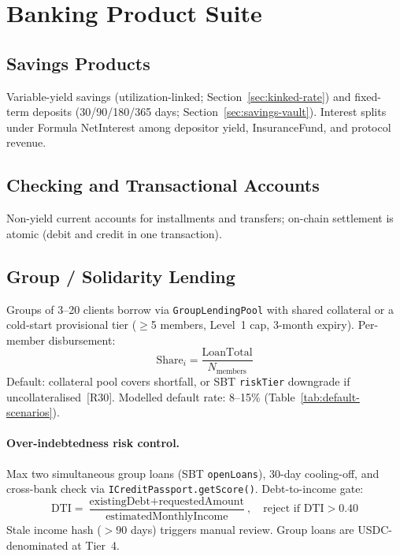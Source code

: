 \documentclass[12pt,a4paper]{report}
\begin{document}
\section{Banking Product Suite}
\label{sec:banking-products}

\subsection{Savings Products}
Variable-yield savings (utilization-linked; Section~\ref{sec:kinked-rate}) and fixed-term deposits (30/90/180/365 days; Section~\ref{sec:savings-vault}). Interest splits under Formula NetInterest among depositor yield, InsuranceFund, and protocol revenue.

\subsection{Checking and Transactional Accounts}
Non-yield current accounts for installments and transfers; on-chain settlement is atomic (debit and credit in one transaction).

\subsection{Group / Solidarity Lending}
Groups of 3--20 clients borrow via \texttt{GroupLendingPool} with shared collateral or a cold-start provisional tier ($\geq$5 members, Level~1 cap, 3-month expiry). Per-member disbursement:
\begin{equation}
\text{Share}_i = \frac{\text{LoanTotal}}{N_{\text{members}}}
\end{equation}
\noindent Default: collateral pool covers shortfall, or SBT \texttt{riskTier} downgrade if uncollateralised~[R30]. Modelled default rate: 8--15\% (Table~\ref{tab:default-scenarios}).

\paragraph{Over-indebtedness risk control.}
\label{sec:over-indebt}
Max two simultaneous group loans (SBT \texttt{openLoans}), 30-day cooling-off, and cross-bank check via \texttt{ICreditPassport.getScore()}. Debt-to-income gate:
\begin{equation}
\text{DTI} = \frac{\text{existingDebt} + \text{requestedAmount}}{\text{estimatedMonthlyIncome}}, \quad \text{reject if DTI} > 0.40
\end{equation}
\noindent Stale income hash ($>90$ days) triggers manual review. Group loans are USDC-denominated at Tier~4.
\end{document}
